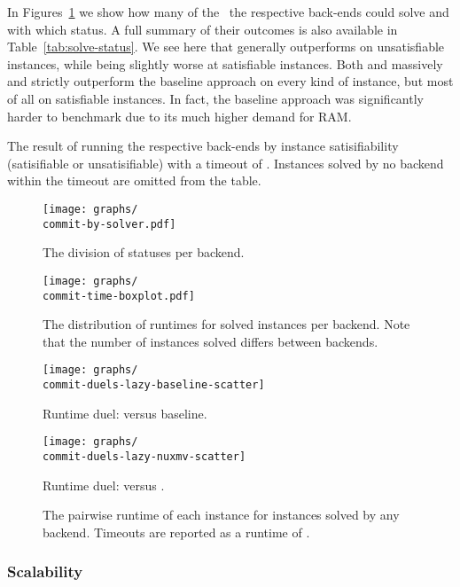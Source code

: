 \documentclass[acmsmall,review,anonymous,screen]{acmart}\settopmatter{printfolios=true,printccs=false,printacmref=true}
\theoremstyle{definition}
\begin{document}
In Figures~\ref{fig:solve-division} we show how many of the~\NrBenchmarks{} the
respective back-ends could solve and with which status. A full summary of their
outcomes is also available in Table~\ref{tab:solve-status}. We see here that
\Calculus{} generally outperforms \Nuxmv{} on unsatisfiable instances, while
being slightly worse at satisfiable instances. Both \Nuxmv{} and \Calculus{}
massively and strictly outperform the baseline approach on every kind of
instance, but most of all on satisfiable instances. In fact, the baseline
approach was significantly harder to benchmark due to its much higher demand for
RAM. 

\begin{table}[ht]
  \centering
  
  \caption{The result of running the respective back-ends by instance
  satisifiability (satisifiable or unsatisifiable) with a timeout of
  \RuntimeTimeout. Instances solved by no backend within the timeout are omitted
  from the table. }\label{tab:solve-status}
\end{table}

\begin{figure}[ht]
  \texttt{[image: graphs/\\commit-by-solver.pdf]}
  \caption{The division of statuses per backend.}
  \label{fig:solve-division}
\end{figure}


\begin{figure}[ht]
  \texttt{[image: graphs/\\commit-time-boxplot.pdf]}
  \caption{The distribution of runtimes for solved instances per backend. Note that the number of instances solved differs between backends.}
  \label{fig:runtime-boxplot}
\end{figure}


\begin{figure}[ht]
  \begin{minipage}[b]{0.75\linewidth}
    \centering 
      \texttt{[image: graphs/\\commit-duels-lazy-baseline-scatter]}
      \caption{Runtime duel: \Calculus{} versus baseline.}
      \texttt{[image: graphs/\\commit-duels-lazy-nuxmv-scatter]}
      \caption{Runtime duel: \Calculus{} versus \Nuxmv.}
    \end{minipage}  
  \caption{The pairwise runtime of each instance for instances solved by any backend. Timeouts are reported as a runtime of \RuntimeTimeout.}
  \label{fig:duels}
\end{figure}

\subsubsection{Scalability}\label{sec:scaling}
\end{document}
